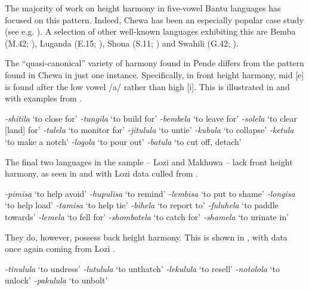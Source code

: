 \documentclass[output=paper]{langscibook}
\begin{document}
The majority of work on height harmony in five-vowel Bantu languages has focused on this pattern. Indeed, Chewa has been an especially popular case study (see e.g. \citealt{Mtenje85, Scullen92, Harris94, Harris97, Sandstedt19}). A selection of other well-known languages exhibiting this are Bemba (M.42; \citealt{Kula00a, Kula02}), Luganda (E.15; \citealt{Katamba84}), Shona (S.11; \citealt{Beckman97}) and Swahili (G.42; \citealt{Marten96, Marten97}).

The ``quasi-canonical'' variety of harmony found in Pende differs from the pattern found in Chewa in just one instance. Specifically, in front height harmony, mid [e] is found after the low vowel /a/ rather than high [i]. This is illustrated in  and  with examples from \citet{Gusimana72CBOLD}.

\begin{multicols}{2}
\ea \label{ex:nichols:pende-f}
\ea \textit{-shitila} `to close for'
\ex \textit{-tungila} `to build for'
\ex \textit{-bembela} `to leave for'
\ex \textit{-solela} `to clear [land] for'
\ex \textit{-talela} `to monitor for'
\z
%
\ex \label{ex:nichols:pende-b}
\ea \textit{-jitulula} `to untie'
\ex \textit{-kubula} `to collapse'
\ex \textit{-ketula} `to make a notch'
\ex \textit{-logola} `to pour out'
\ex \textit{-batula} `to cut off, detach'
\z
\z
\end{multicols}

The final two languages in the sample -- Lozi and Makhuwa -- lack front height harmony, as seen in  and  with Lozi data culled from \citet{Jalla82CBOLD}.

\begin{multicols}{2}
\ea \label{ex:nichols:lozi-fh}
\ea \textit{-pimisa} `to help avoid'
\ex \textit{-hupulisa} `to remind'
\ex \textit{-lembisa} `to put to shame'
\ex \textit{-longisa} `to help load'
\ex \textit{-tamisa} `to help tie'
\z
%
\ex \label{ex:nichols:lozi-fl}
\ea \textit{-bihela} `to report to'
\ex \textit{-fuluhela} `to paddle towards'
\ex \textit{-lemela} `to fell for'
\ex \textit{-shombotela} `to catch for'
\ex \textit{-shamela} `to urinate in'
\z
\z
\end{multicols}

They do, however, possess back height harmony. This is shown in , with data once again coming from Lozi \citep{Jalla82CBOLD}.

\begin{multicols}{2}
\raggedcolumns
\ea \label{ex:nichols:lozi-b}
\ea \textit{-tinulula} `to undress'
\ex \textit{-lutulula} `to unthatch'
\ex \textit{-lekulula} `to resell'
\ex \textit{-notolola} `to unlock'
\ex \textit{-pakulula} `to unbolt'
\z
\z
\end{multicols}
\end{document}
